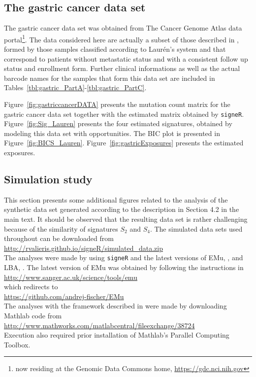 \documentclass[11pt]{amsart}
\theoremstyle{definition}
\begin{document}
\subsection{The gastric cancer data set}
The gastric cancer data set was obtained from The Cancer Genome Atlas
data portal\footnote{now residing at the Genomic Data Commons home,
  \url{https://gdc.nci.nih.gov}}. The data considered here are
actually a subset of those described in \cite{TCGABass}, formed by
those samples classified according to Laur\'en's system and that
correspond to patients without metastatic status and with a consistent
follow up status and enrollment form. Further clinical informations as
well as the actual barcode names for the samples that form this data
set are included in
Tables~\ref{tbl:gastric_PartA}-\ref{tbl:gastric_PartC}.

Figure~\ref{fig:gastriccancerDATA} presents the mutation count matrix
for the gastric cancer data set together with the estimated matrix
obtained by \texttt{signeR}. Figure~\ref{fig:Sig_Lauren} presents the
four estimated signatures, obtained by modeling this data set with
opportunities. The BIC plot is presented in Figure~\ref{fig:BICS_Lauren}. Figure~\ref{fig:gastricExposures}
presents the estimated exposures.

\subsection{Simulation study}
This section presents some additional figures related to the analysis
of the synthetic data set generated according to the description in
Section 4.2 in the main text. It should be observed that the resulting
data set is rather challenging because of the similarity of signatures
$S_2$ and $S_4$. The simulated data sets used throughout can be
downloaded from\\
\indent\indent\url{http://rvalieris.github.io/signeR/simulated_data.zip}\\
The analyses were made by using \texttt{signeR} and
the latest versions of EMu, \cite{FICMV}, and LBA, \cite{A}. The
latest version of EMu was obtained by following the instructions in\\
\indent\indent\url{http://www.sanger.ac.uk/science/tools/emu}\\
which redirects to\\
\indent\indent\url{https://github.com/andrej-fischer/EMu}\\
The analyses with the framework described in \cite{A} were made by
downloading Mathlab code from\\
\indent\indent\url{http://www.mathworks.com/matlabcentral/fileexchange/38724}\\
Execution also required prior installation of Mathlab's Parallel
Computing Toolbox.
\end{document}
